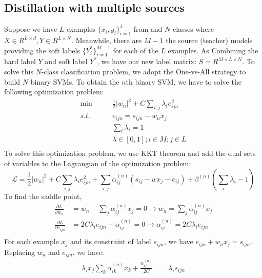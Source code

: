 \subsection{Distillation with multiple sources}
Suppose we have $L$ examples $\{x_i,y_i\}_{i=1}^L$ from and $N$ classes where $X\in R^{L\times d}, Y\in R^{L\times N}$. Meanwhile, there are $M-1$ the source (teacher) models providing the soft labels $\{Y^*_i\}_{i=1}^{M-1}$ for each of the $L$ examples. As 
Combining the hard label $Y$ and soft label $Y^*$, we have our new label matrix: $S = R^{M\times L \times N}$. To solve this $N$-class classification problem, we adopt the One-vs-All strategy to build $N$ binary SVMs.
To obtain the $n$th binary SVM, we have to solve the following optimization problem: 
\begin{equation}\label{eq:multi-distill}
\begin{aligned}
\min \qquad & \frac{1}{2}{\left| w_n \right|^2} + C\sum_{i,j} \lambda_i{e_{ijn}^2} \\
s.t.\qquad& e_{ijn} = s_{ijn} - w_nx_j\\
& \sum_i\lambda_i=1\\
& \lambda \in [0,1]; i\in M;  j\in L\\
\end{aligned}  
\end{equation}
To solve this optimization problem, we use KKT theorem \cite{cristianini2000introduction} and add the dual sets of variables to the Lagrangian of the optimization problem:
\begin{equation}
\mathcal{L}=\frac{1}{2}{\left| w_n \right|^2} + C\sum_{i,j} \lambda_i{e_{ijn}^2}+\sum_{i,j}\alpha^{(n)}_{ij}\left(s_{ij} - wx_j-e_{ij}\right)+\beta^{(n)}\left(\sum_i\lambda_i-1\right)
\end{equation}
To find the saddle point, 
\begin{equation}
\begin{aligned}
\frac{{\partial L}}{{\partial w_n}}& = w_n - \sum_{j}\alpha^{(n)}_{ij} {x_j}=0 \rightarrow w_n = \sum_{j}\alpha^{(n)}_{ij} {x_j}\\
\frac{{\partial L}}{{\partial {e_{ijn}}}} & = 2C\lambda_i {e_{ijn}} - {\alpha^{(n)} _{ij}}=0 \rightarrow \alpha^{(n)}_{ij} = 2C\lambda_i {e_{ijn}}\\
\end{aligned}
\end{equation}
For each example $x_j$ and its constraint of label $s_{ijn}$, we have $e_{ijn}  + w_nx_j= s_{ijn}$. Replacing $w_n$ and $e_{ijn}$,  we have:  
\begin{equation}
\begin{aligned}
\lambda_ix_j\sum_{k}\alpha^{(n)}_{ik}x_k+\frac{\alpha^{(n)}_{ij}}{2C}&=\lambda_is_{ijn}
\end{aligned}
\end{equation}
